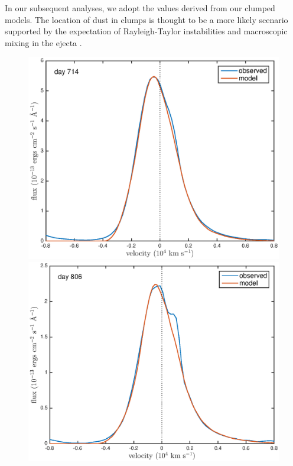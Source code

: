 \documentclass[useAMS,usenatbib,usegraphicx]{mnras}
\begin{document}
In our subsequent analyses, we adopt the values derived from our clumped models.  The location of dust in clumps is thought to be a more likely scenario supported by the expectation of Rayleigh-Taylor instabilities and macroscopic mixing in the ejecta \cite{Ercolano2007,Hammer2010}.




 \begin{figure}
\begin{center}
\includegraphics[trim =33 10 45 15,clip=true,scale=0.47]{clump_1/best_fit/d714Ha_new}
\includegraphics[trim =33 10 45 15,clip=true,scale=0.47]{clump_1/best_fit/d806Ha_new}

\end{center}
\end{figure}
\end{document}
